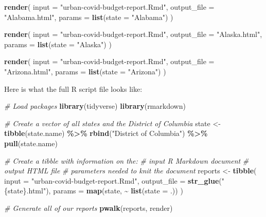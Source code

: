 \documentclass[
]{book}
\newenvironment{Shaded}{\begin{snugshade}}{\end{snugshade}}
\newcommand{\AttributeTok}[1]{\textcolor[rgb]{0.13,0.29,0.53}{#1}}
\newcommand{\CommentTok}[1]{\textcolor[rgb]{0.56,0.35,0.01}{\textit{#1}}}
\newcommand{\FunctionTok}[1]{\textcolor[rgb]{0.13,0.29,0.53}{\textbf{#1}}}
\newcommand{\NormalTok}[1]{#1}
\newcommand{\OtherTok}[1]{\textcolor[rgb]{0.56,0.35,0.01}{#1}}
\newcommand{\SpecialCharTok}[1]{\textcolor[rgb]{0.81,0.36,0.00}{\textbf{#1}}}
\newcommand{\StringTok}[1]{\textcolor[rgb]{0.31,0.60,0.02}{#1}}
\begin{document}
\begin{Shaded}
\begin{Highlighting}[]
\FunctionTok{render}\NormalTok{(}
  \AttributeTok{input =} \StringTok{"urban{-}covid{-}budget{-}report.Rmd"}\NormalTok{,}
  \AttributeTok{output\_file =} \StringTok{"Alabama.html"}\NormalTok{,}
  \AttributeTok{params =} \FunctionTok{list}\NormalTok{(}\AttributeTok{state =} \StringTok{"Alabama"}\NormalTok{)}
\NormalTok{)}

\FunctionTok{render}\NormalTok{(}
  \AttributeTok{input =} \StringTok{"urban{-}covid{-}budget{-}report.Rmd"}\NormalTok{,}
  \AttributeTok{output\_file =} \StringTok{"Alaska.html"}\NormalTok{,}
  \AttributeTok{params =} \FunctionTok{list}\NormalTok{(}\AttributeTok{state =} \StringTok{"Alaska"}\NormalTok{)}
\NormalTok{)}

\FunctionTok{render}\NormalTok{(}
  \AttributeTok{input =} \StringTok{"urban{-}covid{-}budget{-}report.Rmd"}\NormalTok{,}
  \AttributeTok{output\_file =} \StringTok{"Arizona.html"}\NormalTok{,}
  \AttributeTok{params =} \FunctionTok{list}\NormalTok{(}\AttributeTok{state =} \StringTok{"Arizona"}\NormalTok{)}
\NormalTok{)}
\end{Highlighting}
\end{Shaded}

Here is what the full R script file looks like:

\begin{Shaded}
\begin{Highlighting}[]
\CommentTok{\# Load packages}
\FunctionTok{library}\NormalTok{(tidyverse)}
\FunctionTok{library}\NormalTok{(rmarkdown)}

\CommentTok{\# Create a vector of all states and the District of Columbia}
\NormalTok{state }\OtherTok{\textless{}{-}} \FunctionTok{tibble}\NormalTok{(state.name) }\SpecialCharTok{\%\textgreater{}\%}
  \FunctionTok{rbind}\NormalTok{(}\StringTok{"District of Columbia"}\NormalTok{) }\SpecialCharTok{\%\textgreater{}\%}
  \FunctionTok{pull}\NormalTok{(state.name)}

\CommentTok{\# Create a tibble with information on the:}
\CommentTok{\# input R Markdown document}
\CommentTok{\# output HTML file}
\CommentTok{\# parameters needed to knit the document}
\NormalTok{reports }\OtherTok{\textless{}{-}} \FunctionTok{tibble}\NormalTok{(}
  \AttributeTok{input =} \StringTok{"urban{-}covid{-}budget{-}report.Rmd"}\NormalTok{,}
  \AttributeTok{output\_file =} \FunctionTok{str\_glue}\NormalTok{(}\StringTok{"\{state\}.html"}\NormalTok{),}
  \AttributeTok{params =} \FunctionTok{map}\NormalTok{(state, }\SpecialCharTok{\textasciitilde{}} \FunctionTok{list}\NormalTok{(}\AttributeTok{state =}\NormalTok{ .))}
\NormalTok{)}

\CommentTok{\# Generate all of our reports}
\FunctionTok{pwalk}\NormalTok{(reports, render)}
\end{Highlighting}
\end{Shaded}
\end{document}

